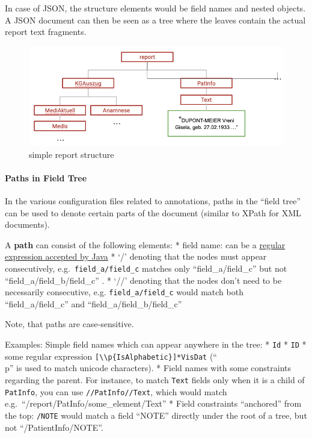 In case of JSON, the structure elements would be field names and nested
objects. A JSON document can then be seen as a tree where the leaves
contain the actual report text fragments.

\begin{figure}
\centering
\includegraphics[width=\textwidth]{figs/report_structure.png}
\caption{simple report structure}
\end{figure}

\paragraph{Paths in Field Tree}\label{paths-in-field-tree}

In the various configuration files related to annotations, paths in the
``field tree'' can be used to denote certain parts of the document
(similar to XPath for XML documents).

A \textbf{path} can consist of the following elements: * field name: can
be a
\href{https://docs.oracle.com/javase/8/docs/api/java/util/regex/Pattern.html}{regular
expression accepted by Java} * `/' denoting that the nodes must appear
consecutively, e.g.~\texttt{field\_a/field\_c} matches only
``field\_a/field\_c'' but not ``field\_a/field\_b/field\_c'' . * `//'
denoting that the nodes don't need to be necessarily consecutive, e.g.
\texttt{field\_a/field\_c} would match both ``field\_a/field\_c'' and
``field\_a/field\_b/field\_c''

Note, that paths are case-sensitive.

Examples:
Simple field names which can appear anywhere in the tree: *
\texttt{Id} * \texttt{ID} * some regular expression
\texttt{{[}\textbackslash{}\textbackslash{}p\{IsAlphabetic\}{]}*VisDat}
(``\\p'' is used to match unicode characters). * Field names with some
constraints regarding the parent. For instance, to match \texttt{Text}
fields only when it is a child of \texttt{PatInfo}, you can use
\texttt{//PatInfo//Text}, which would match
e.g.~``/report/PatInfo/some\_element/Text'' * Field constraints
``anchored'' from the top: \texttt{/NOTE} would match a field ``NOTE''
directly under the root of a tree, but not ``/PatientInfo/NOTE''.

